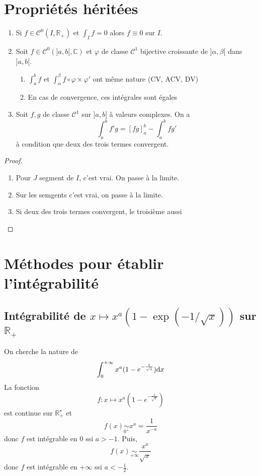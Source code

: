 \section{Propriétés héritées}

\begin{prop}
    \begin{enumerate}
        \item Si $f\in\mathcal C^0(I, \mathbb R_+)$ et $\int_If=0$ alors $f\equiv 0$ sur $I$.
        \item Soit $f\in\mathcal C^0(]a, b[, \mathbb C)$ et $\varphi$ de classe $\mathcal C^1$ bijective croissante de $]\alpha, \beta[$ dans $]a, b[$. \begin{enumerate}
            \item $\int_a^bf$ et $\int_\alpha^\beta f\circ \varphi\times \varphi'$ ont même nature (CV, ACV, DV)
            \item En cas de convergence, ces intégrales sont égales
        \end{enumerate}
    \item Soit $f, g$ de classe $\mathcal C^1$ sur $]a, b[$ à valeurs complexes. On a \[
            \int_a^bf'g=[fg]_a^b-\int_a^bfg'
        \]
        à condition que deux des trois termes convergent.
    \end{enumerate}
\end{prop}

\begin{proof}~
    \begin{enumerate}
        \item Pour $J$ segment de $I$, c'est vrai. On passe à la limite.
        \item Sur les semgents c'est vrai, on passe à la limite.
        \item Si deux des trois termes convergent, le troisième aussi
    \end{enumerate}
\end{proof}

\section{Méthodes pour établir l'intégrabilité}

\subsection{Intégrabilité de $x\longmapsto x^a(1-\exp(-1/\sqrt x))$ sur $\mathbb R_+$}

On cherche la nature de \[
    \int_0^{+\infty} x^a(1-e^{-\frac1{\sqrt x}})\mathrm{d} x
\]
La fonction \[
    f:x\longmapsto x^a(1-e^{-\frac1{\sqrt x}})
\]
est continue sur $\mathbb R_+^\star$ et \[
    f(x)\underset{0^+}\sim x^a=\frac1{x^{-a}}
\]
donc $f$ est intégrable en $0$ ssi $a>-1$. Puis, \[
    f(x)\underset{+\infty}\sim\frac{x^a}{\sqrt x}
\]
donc $f$ est intégrable en $+\infty$ ssi $a<-\frac12$.

